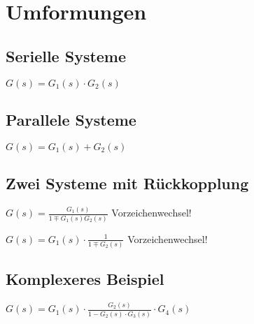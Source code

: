 \section{Umformungen}
	\subsection{Serielle Systeme}
		
		$G(s) = G_1(s) \cdot G_2(s)$
	\subsection{Parallele Systeme}
		
		$G(s) = G_1(s) + G_2(s)$
	\subsection{Zwei Systeme mit Rückkopplung}
		\begin{multicols}{2}
		\newline
		$G(s) = \frac{G_1(s)}{1 \mp G_1(s) G_2(s)}$ Vorzeichenwechsel!
		\columnbreak
		
		\newline
		$G(s) = G_1(s) \cdot \frac{1}{1 \mp G_2(s)}$ Vorzeichenwechsel!
		
		\end{multicols}
	\subsection{Komplexeres Beispiel}
		
		$G(s) = G_1(s) \cdot \frac{G_2(s)}{1-G_2(s) \cdot G_3(s)} \cdot G_4(s)$
